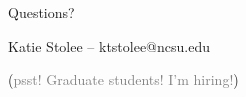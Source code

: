 \begin{frame}
\Huge{\centerline{Questions?}}
\centering
\Large
Katie Stolee -- ktstolee@ncsu.edu

\vspace{24pt}
(\textcolor{gray}{psst! Graduate students! I'm hiring!})
\end{frame}



